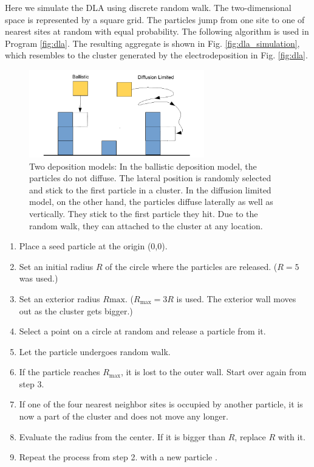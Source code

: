 Here we simulate the DLA using discrete random walk.  The two-dimensional space is represented by a square grid.  The particles jump from one site to one of nearest sites at random with equal probability.  The following algorithm is used in Program \ref{fig:dla}.
The resulting aggregate is shown in Fig. \ref{fig:dla_simulation}, which resembles to the cluster generated by the electrodeposition in Fig. \ref{fig:dla}.

\begin{figure}
\centering
\includegraphics[width=3in]{16.Random-Walk/deposition_model.pdf}
\caption{Two deposition models:  In the ballistic deposition model, the particles do not diffuse.  The lateral position is randomly selected and stick to the first particle in a cluster.  In the diffusion limited model, on the other hand, the particles diffuse laterally as well as vertically.  They stick to the first particle they hit.  Due to the random walk, they can attached to the cluster at any location.} 
\label{fig:deposition_model}
\end{figure}

\begin{myalgobox}
\label{algo:dla}

\medskip
\begin{minipage}{5.5in}
\small
\begin{enumerate}
\item Place a seed particle at the origin (0,0).
\item Set an initial radius $R$ of the circle where the particles are released.  ($R=5$ was used.)
\item Set an exterior radius $R\text{max}$.  ($R_\text{max}=3R$ is used.  The exterior wall moves out as the cluster gets bigger.)
\item Select a point on a circle at random and release a particle from it.
\item Let the particle undergoes random walk.
\item If the particle reaches $R_\text{max}$, it is lost to the outer wall. Start over again from step 3.
\item If one of the four nearest neighbor sites is occupied by another particle, it is now  a part of the cluster and does not move any longer.
\item Evaluate the radius from the center.  If it is bigger than $R$, replace $R$ with it.
\item Repeat the process from step 2. with a new particle .
\end{enumerate}
\end{minipage}
\end{myalgobox}





